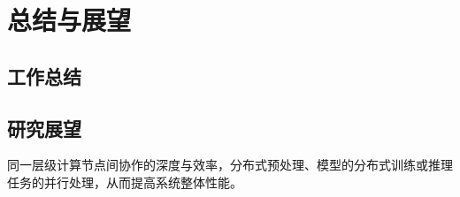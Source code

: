 \chapter{总结与展望}

\section{工作总结}

\section{研究展望}

同一层级计算节点间协作的深度与效率，分布式预处理、模型的分布式训练或推理任务的并行处理，从而提高系统整体性能。
